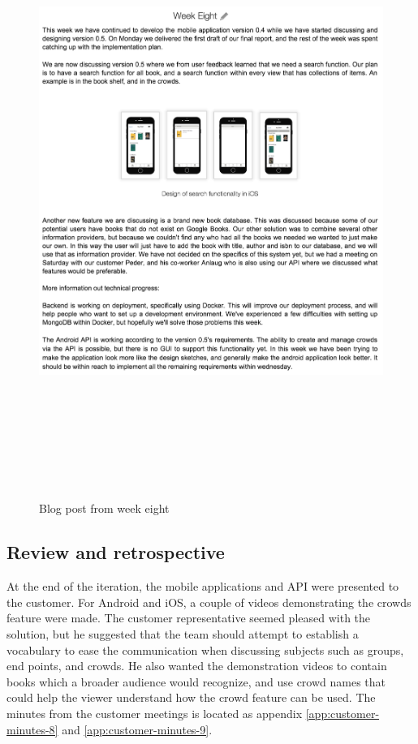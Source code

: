 \begin{figure}
\centering
\includegraphics[height=20cm]{figs/v04/WeekEight.png}
\caption{Blog post from week eight}
\label{fig:blog-week-eight}
\end{figure}

\subsection{Review and retrospective}

At the end of the iteration, the mobile applications and \gls{API} were presented to the customer. For Android and iOS, a couple of videos demonstrating the crowds feature were made. The customer representative seemed pleased with the solution, but he suggested that the team should attempt to establish a vocabulary to ease the communication when discussing subjects such as groups, end points, and crowds. He also wanted the demonstration videos to contain books which a broader audience would recognize, and use crowd names that could help the viewer understand how the crowd feature can be used. The minutes from the customer meetings is located as appendix \ref{app:customer-minutes-8} and \ref{app:customer-minutes-9}.

